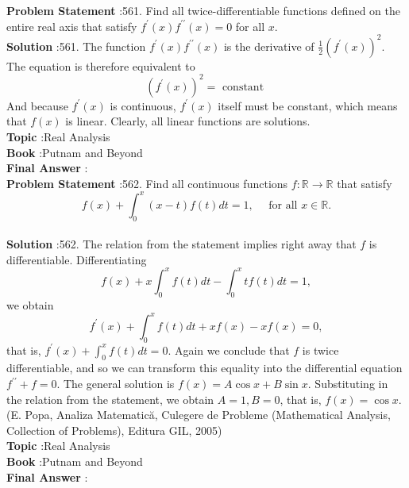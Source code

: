 \documentclass[10pt]{article}
\begin{document}
\textbf{Problem Statement} :561. Find all twice-differentiable functions defined on the entire real axis that satisfy $f^{\prime}(x) f^{\prime \prime}(x)=0$ for all $x$.\\
\textbf{Solution} :561. The function $f^{\prime}(x) f^{\prime \prime}(x)$ is the derivative of $\frac{1}{2}\left(f^{\prime}(x)\right)^{2}$. The equation is therefore equivalent to$$ \left(f^{\prime}(x)\right)^{2}=\text { constant } $$And because $f^{\prime}(x)$ is continuous, $f^{\prime}(x)$ itself must be constant, which means that $f(x)$ is linear. Clearly, all linear functions are solutions. \\
\textbf{Topic} :Real Analysis\\
\textbf{Book} :Putnam and Beyond\\
\textbf{Final Answer} :\\


\textbf{Problem Statement} :562. Find all continuous functions $f: \mathbb{R} \rightarrow \mathbb{R}$ that satisfy$$ f(x)+\int_{0}^{x}(x-t) f(t) d t=1, \quad \text { for all } x \in \mathbb{R} . $$\\
\textbf{Solution} :562. The relation from the statement implies right away that $f$ is differentiable. Differentiating$$ f(x)+x \int_{0}^{x} f(t) d t-\int_{0}^{x} t f(t) d t=1, $$we obtain$$ f^{\prime}(x)+\int_{0}^{x} f(t) d t+x f(x)-x f(x)=0, $$that is, $f^{\prime}(x)+\int_{0}^{x} f(t) d t=0$. Again we conclude that $f$ is twice differentiable, and so we can transform this equality into the differential equation $f^{\prime \prime}+f=0$. The general solution is $f(x)=A \cos x+B \sin x$. Substituting in the relation from the statement, we obtain $A=1, B=0$, that is, $f(x)=\cos x$.(E. Popa, Analiza Matematică, Culegere de Probleme (Mathematical Analysis, Collection of Problems), Editura GIL, 2005)\\
\textbf{Topic} :Real Analysis\\
\textbf{Book} :Putnam and Beyond\\
\textbf{Final Answer} :\\
\end{document}
